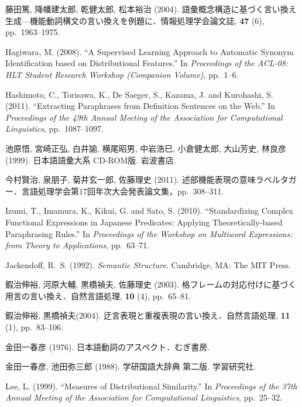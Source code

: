 \documentclass[japanese]{jnlp_1.4}
\begin{document}
\begin{thebibliography}{}
\item
藤田篤, 降幡建太郎, 乾健太郎, 松本裕治 (2004). 
語彙概念構造に基づく言い換え生成—機能動詞構文の言い換えを例題に．情報処理学会論文誌, 
\textbf{47} (6), pp.~1963--1975.

\item
Hagiwara, M. (2008). ``A Supervised Learning Approach to Automatic Synonym 
Identification based on Distributional Features.'' In \textit{Proceedings of the ACL-08: HLT Student Research Workshop (Companion Volume)}, pp.~1--6.

\item
Hashimoto, C., Torisawa, K., De Saeger, S., Kazama, J. and Kurohashi, S. 
(2011). ``Extracting Paraphrases from Definition Sentences on the Web.'' In 
\textit{Proceedings of the 49th Annual Meeting of the Association for Computational Linguistics}, pp.~1087--1097.

\item
池原悟, 宮崎正弘, 白井諭, 横尾昭男, 中岩浩巳, 小倉健太郎, 大山芳史, 林良彦 
(1999). 日本語語彙大系 CD-ROM版. 岩波書店.

\item
今村賢治, 泉朋子, 菊井玄一郎, 佐藤理史 (2011). 
述部機能表現の意味ラベルタガー．言語処理学会第17回年次大会発表論文集，pp.~308--311.

\item
Izumi, T., Imamura, K., Kikui, G. and Sato, S. (2010). ``Standardizing 
Complex Functional Expressions in Japanese Predicates: Applying 
Theoretically-based Paraphrasing Rules.'' In \textit{Proceedings of the Workshop on Multiword Expressions: from Theory to Applications}, pp.~63--71.

\item
Jackendoff, R.~S. (1992). \textit{Semantic Structure}. Cambridge, MA: The MIT Press.

\item
鍜治伸裕, 河原大輔, 黒橋禎夫, 佐藤理史 (2003). 
格フレームの対応付けに基づく用言の言い換え．自然言語処理, \textbf{10} (4), 
pp.~65--81.

\item
鍜治伸裕, 黒橋禎夫(2004). 迂言表現と重複表現の言い換え．自然言語処理, 
\textbf{11} (1), pp.~83--106.

\item
金田一春彦 (1976). 日本語動詞のアスペクト．むぎ書房.

\item
金田一春彦, 池田弥三郎 (1988). 学研国語大辞典 第二版. 学習研究社.

\item
Lee, L. (1999). ``Measures of Distributional Similarity.'' In \textit{Proceedings of the 37th Annual Meeting of the Association for Computational Linguistics}, pp.~25--32.


\end{thebibliography}
\end{document}
